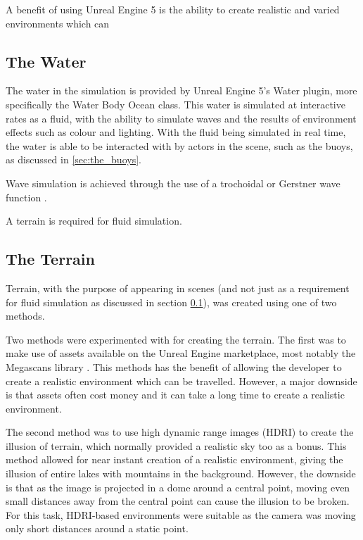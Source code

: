 \documentclass[10pt,twocolumn,letterpaper]{article}
\begin{document}
A benefit of using Unreal Engine 5 is the ability to create realistic and varied environments which can 


\subsection{The Water} \label {sec:the_water}

The water in the simulation is provided by Unreal Engine 5's Water plugin, more specifically the Water Body Ocean class. This water is simulated at interactive rates as a fluid, with the ability to simulate waves and the results of environment effects such as colour and lighting. With the fluid being simulated in real time, the water is able to be interacted with by actors in the scene, such as the buoys, as discussed in \ref{sec:the_buoys}.

Wave simulation is achieved through the use of a trochoidal or Gerstner wave function \cite{constantin2017gerstner}.

A terrain is required for fluid simulation.

\subsection{The Terrain}

Terrain, with the purpose of appearing in scenes (and not just as a requirement for fluid simulation as discussed in section \ref{sec:the_water}), was created using one of two methods.

Two methods were experimented with for creating the terrain. The first was to make use of assets available on the Unreal Engine marketplace, most notably the Megascans library \cite{QuixelMegascans}. This methods has the benefit of allowing the developer to create a realistic environment which can be travelled. However, a major downside is that assets often cost money and it can take a long time to create a realistic environment.

The second method was to use high dynamic range images (HDRI) to create the illusion of terrain, which normally provided a realistic sky too as a bonus. This method allowed for near instant creation of a realistic environment, giving the illusion of entire lakes with mountains in the background. However, the downside is that as the image is projected in a dome around a central point, moving even small distances away from the central point can cause the illusion to be broken. For this task, HDRI-based environments were suitable as the camera was moving only short distances around a static point.
\end{document}
